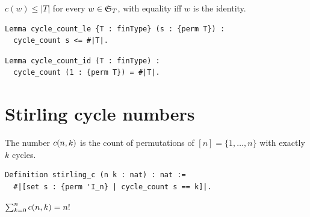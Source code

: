 \begin{lemma}
  \label{lem:cycle_count_le}
  $c(w) \leq |T|$ for every $w \in \mathfrak{S}_{T}$, with equality iff $w$
  is the identity.
\end{lemma}

\begin{lstlisting}[language=Rocq]
Lemma cycle_count_le {T : finType} (s : {perm T}) :
  cycle_count s <= #|T|.
\end{lstlisting}


\begin{lstlisting}[language=Rocq]
Lemma cycle_count_id (T : finType) :
  cycle_count (1 : {perm T}) = #|T|.
\end{lstlisting}


\section{Stirling cycle numbers}

\begin{definition}
  \label{def:stirling_c}
  The number $c(n, k)$ is the count of permutations of
  $[n] = \{1, \dots, n\}$ with exactly $k$ cycles.
\end{definition}

\begin{lstlisting}[language=Rocq]
Definition stirling_c (n k : nat) : nat :=
  #|[set s : {perm 'I_n} | cycle_count s == k]|.
\end{lstlisting}


\begin{lemma}
  \label{lem:stirling_c_row_sum_fact}
  $\sum_{k=0}^{n} c(n, k) = n!$
\end{lemma}

